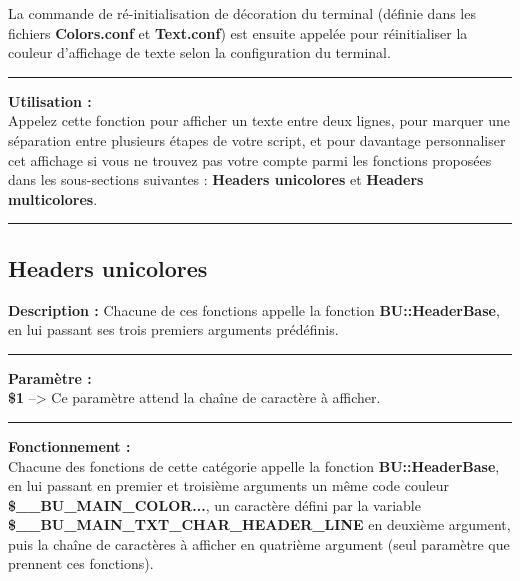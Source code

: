 \documentclass[a4paper,10pt]{article}
\begin{document}
\begin{justify}
    La commande de ré-initialisation de décoration du terminal (définie dans les fichiers \textbf{\color{lime}Colors.conf} et \textbf{\color{lime}Text.conf}) est ensuite appelée pour réinitialiser la couleur d'affichage de texte selon la configuration du terminal.
\end{justify}

\par\noindent\rule{\textwidth}{0.4pt}

\begin{justify}
    \textbf{Utilisation :}\\[1\baselineskip]
    Appelez cette fonction pour afficher un texte entre deux lignes, pour marquer une séparation entre plusieurs étapes de votre script, et pour davantage personnaliser cet affichage si vous ne trouvez pas votre compte parmi les fonctions proposées dans les sous-sections suivantes : \textbf{\color{green}Headers unicolores} et \textbf{\color{green}Headers multicolores}.
\end{justify}




\color{green}\par\noindent\rule{\textwidth}{0.4pt}\color{white}

\color{green}
\subsection{Headers unicolores}\color{white}

\begin{justify}
    \textbf{Description :}
    Chacune de ces fonctions appelle la fonction \textbf{\color{mauve}BU::HeaderBase}, en lui passant ses trois premiers arguments prédéfinis.
\end{justify}

\par\noindent\rule{\textwidth}{0.4pt}

\begin{justify}
    \textbf{Paramètre :}\\
    \textbf{\color{orange}\$1} --> Ce paramètre attend la chaîne de caractère à afficher.
\end{justify}

\par\noindent\rule{\textwidth}{0.4pt}

\begin{justify}
    \textbf{Fonctionnement :}\\
    Chacune des fonctions de cette catégorie appelle la fonction \textbf{\color{mauve}BU::HeaderBase}, en lui passant en premier et troisième arguments un même code couleur \textbf{\color{orange}\$\_\_BU\_MAIN\_COLOR...}, un caractère défini par la variable \textbf{\color{orange}\$\_\_BU\_MAIN\_TXT\_CHAR\_HEADER\_LINE} en deuxième argument, puis la chaîne de caractères à afficher en quatrième argument (seul paramètre que prennent ces fonctions).
\end{justify}
\end{document}
